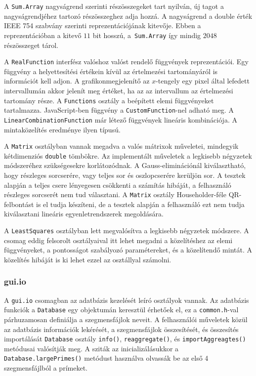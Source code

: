 A \texttt{Sum.Array} nagyságrend szerinti részösszegeket tart nyilván, új tagot a nagyságrendjéhez tartozó részösszeghez adja hozzá.
A nagyságrend a double érték IEEE 754 szabvány szerinti reprezentációjának kitevője. Ebben a reprezentációban a kitevő $11$ bit hosszú, a\texttt{ Sum.Array} így mindig $2048$ részösszeget tárol.

A \texttt{RealFunction} interfész valóshoz valóst rendelő függvények reprezentációi.
Egy függvény a helyettesítési értékein kívül az értelmezési tartományáról is információt kell adjon.
A grafikonmegjelenítő az $x$-tengely egy pixel által lefedett intervallumán akkor jelenít meg értéket, ha az az intervallum az értelmezési tartomány része.
A \texttt{Functions} osztály a beépített elemi függvényeket tartalmazza.
JavaScript-ben függvény a \texttt{CustomFunction}-nel adható meg.
A \texttt{LinearCombinationFunction} már létező függvények lineáris kombinációja.
A mintaközelítés eredménye ilyen típusú.

A \texttt{Matrix} osztályban vannak megadva a valós mátrixok műveletei, mindegyik kétdimenziós \texttt{double} tömbökre.
Az implementált műveletek a legkisebb négyzetek módszeréhez szükségesekre korlátozódnak.
A Gauss-eliminációnál kiválasztható, hogy részleges sorcserére, vagy teljes sor és oszlopcserére kerüljön sor.
A tesztek alapján a teljes csere lényegesen csökkenti a számítás hibáját, a felhasználó részleges sorcserét nem tud választani.
A \texttt{Matrix} osztály Householder-féle QR-felbontást is el tudja készíteni, de a tesztek alapján a felhasználó ezt nem tudja kiválasztani lineáris egyenletrendszerek megoldására.

A \texttt{LeastSquares} osztályban lett megvalósítva a legkisebb négyzetek módszere.
A csomag eddig felsorolt osztályaival itt lehet megadni a közelítéshez az elemi függvényeket, a pontosságot szabályozó paramétereket, és a közelítendő mintát.
A közelítés hibáját is ki lehet ezzel az osztállyal számolni.

\subsubsection{gui.io}

A \texttt{gui.io} csomagban az adatbázis kezelését leíró osztályok vannak.
Az adatbázis funkciók a \texttt{Database} egy objektumán keresztül érhetőek el, ez a \texttt{common.h}-val párhuzamosan definiálja a szegmensfájlok neveit.
A felhasználói műveletek közül az adatbázis információk lekérését, a szegmensfájlok összesítését, és összesítés importálását \texttt{Database} osztály \texttt{info()}, \texttt{reaggregate()}, és \texttt{importAggreagtes()} metódusai valósítják meg.
A sziták az inicializálásukkor a \texttt{Database.largePrimes()} metódust használva olvassák be az első 4 szegmensfájlból a prímeket.

